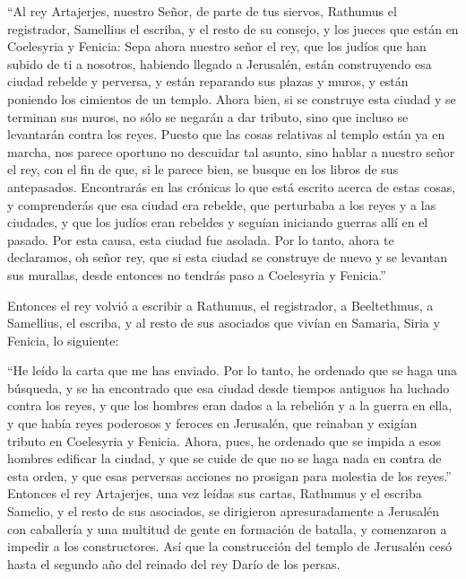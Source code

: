  ``Al rey Artajerjes, nuestro Señor, de parte de tus
siervos, Rathumus el registrador, Samellius el escriba, y el resto de su
consejo, y los jueces que están en Coelesyria y Fenicia: 
Sepa ahora nuestro señor el rey, que los judíos que han subido de ti a
nosotros, habiendo llegado a Jerusalén, están construyendo esa ciudad
rebelde y perversa, y están reparando sus plazas y muros, y están
poniendo los cimientos de un templo.  Ahora bien, si se
construye esta ciudad y se terminan sus muros, no sólo se negarán a dar
tributo, sino que incluso se levantarán contra los reyes.
 Puesto que las cosas relativas al templo están ya en
marcha, nos parece oportuno no descuidar tal asunto, 
sino hablar a nuestro señor el rey, con el fin de que, si le parece
bien, se busque en los libros de sus antepasados. 
Encontrarás en las crónicas lo que está escrito acerca de estas cosas, y
comprenderás que esa ciudad era rebelde, que perturbaba a los reyes y a
las ciudades,  y que los judíos eran rebeldes y seguían
iniciando guerras allí en el pasado. Por esta causa, esta ciudad fue
asolada.  Por lo tanto, ahora te declaramos, oh señor
rey, que si esta ciudad se construye de nuevo y se levantan sus
murallas, desde entonces no tendrás paso a Coelesyria y Fenicia.''

 Entonces el rey volvió a escribir a Rathumus, el
registrador, a Beeltethmus, a Samellius, el escriba, y al resto de sus
asociados que vivían en Samaria, Siria y Fenicia, lo siguiente:

 ``He leído la carta que me has enviado. Por lo tanto, he
ordenado que se haga una búsqueda, y se ha encontrado que esa ciudad
desde tiempos antiguos ha luchado contra los reyes,  y
que los hombres eran dados a la rebelión y a la guerra en ella, y que
había reyes poderosos y feroces en Jerusalén, que reinaban y exigían
tributo en Coelesyria y Fenicia.  Ahora, pues, he
ordenado que se impida a esos hombres edificar la ciudad, y que se cuide
de que no se haga nada en contra de esta orden,  y que
esas perversas acciones no prosigan para molestia de los reyes.''
 Entonces el rey Artajerjes, una vez leídas sus cartas,
Rathumus y el escriba Samelio, y el resto de sus asociados, se
dirigieron apresuradamente a Jerusalén con caballería y una multitud de
gente en formación de batalla, y comenzaron a impedir a los
constructores. Así que la construcción del templo de Jerusalén cesó
hasta el segundo año del reinado del rey Darío de los persas.

